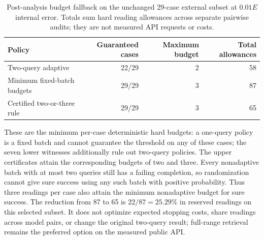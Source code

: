 \begin{table}[htbp]\centering\small
\caption{Post-analysis budget fallback on the unchanged 29-case external
subset at $0.01E$ internal error. Totals sum hard reading allowances across
separate pairwise audits; they are not measured API requests or costs.}
\label{tab:stored-error-fallback}
\begin{tabular}{lrrr}\toprule
Policy & Guaranteed cases & Maximum budget & Total allowances\\\midrule
Two-query adaptive & 22/29 & 2 & 58\\
Minimum fixed-batch budgets & 29/29 & 3 & 87\\
Certified two-or-three rule & 29/29 & 3 & 65\\\bottomrule
\end{tabular}\end{table}

These are the minimum per-case deterministic hard budgets: a one-query
policy is a fixed batch and cannot guarantee the threshold on any of these
cases; the seven lower witnesses additionally rule out two-query policies.
The upper certificates attain the corresponding budgets of two and three.
Every nonadaptive batch with at most two queries still has a failing
completion, so randomization cannot give sure success using any such batch
with positive probability. Thus three readings per case also attain the
minimum nonadaptive budget for sure success. The reduction from 87 to 65 is
$22/87=25.29\%$ in reserved readings on this selected subset. It does not
optimize expected stopping costs, share readings across model pairs, or
change the original two-query result; full-range retrieval remains the
preferred option on the measured public API.
\FloatBarrier
